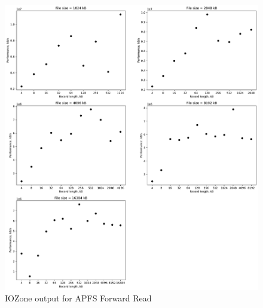 \begin{figure}[!htb]
	\label{fig:app_bench_apfs_rnd_read}
	\begin{center}
		\includegraphics[width=1.0\textwidth]{figures/benchmarking/local/Read.pdf}
	\end{center}
	\caption{IOZone output for APFS Forward Read}
\end{figure}

